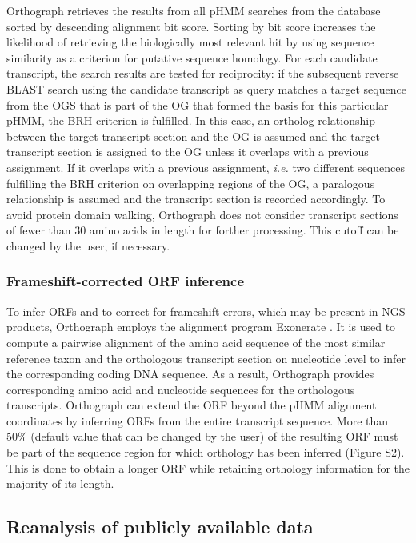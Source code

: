 Orthograph retrieves the results from all pHMM searches from the
database sorted by descending alignment bit score. Sorting by bit score
increases the likelihood of retrieving the biologically most relevant
hit by using sequence similarity as a criterion for putative sequence
homology. For each candidate transcript, the search results are tested
for reciprocity: if the subsequent reverse BLAST search using the
candidate transcript as query matches a target sequence from the OGS
that is part of the OG that formed the basis for this particular pHMM,
the BRH criterion is fulfilled. In this case, an ortholog relationship
between the target transcript section and the OG is assumed and the
target transcript section is assigned to the OG unless it overlaps with
a previous assignment. If it overlaps with a previous assignment,
\emph{i.e.} two different sequences fulfilling the BRH criterion on
overlapping regions of the OG, a paralogous relationship is assumed and
the transcript section is recorded accordingly. To avoid protein domain
walking, Orthograph does not consider transcript sections of fewer than
30 amino acids in length for forther processing. This cutoff can be
changed by the user, if necessary.

\subsubsection{Frameshift-corrected ORF
inference}\label{frameshift-corrected-orf-inference}

To infer ORFs and to correct for frameshift errors, which may be present
in NGS products, Orthograph employs the alignment program Exonerate
\citep{Slater2005}. It is used to compute a pairwise alignment of the
amino acid sequence of the most similar reference taxon and the
orthologous transcript section on nucleotide level to infer the
corresponding coding DNA sequence. As a result, Orthograph provides
corresponding amino acid and nucleotide sequences for the orthologous
transcripts. Orthograph can extend the ORF beyond the pHMM alignment
coordinates by inferring ORFs from the entire transcript sequence. More
than 50\% (default value that can be changed by the user) of the
resulting ORF must be part of the sequence region for which orthology
has been inferred (Figure S2). This is done to obtain a longer ORF while
retaining orthology information for the majority of its length.

\subsection{Reanalysis of publicly available
data}\label{reanalysis-of-publicly-available-data}

